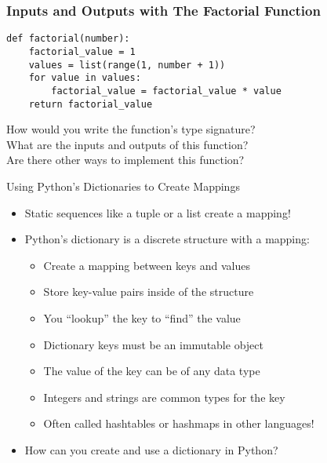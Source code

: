 \documentclass[14pt,aspectratio=169]{beamer}
\begin{document}
%
\begin{frame}[fragile]
  \frametitle{Inputs and Outputs with The Factorial Function}
  \hspace*{-.2in}
  \begin{minipage}{6in}
    \vspace*{.2in}
    \begin{verbatim}
def factorial(number):
    factorial_value = 1
    values = list(range(1, number + 1))
    for value in values:
        factorial_value = factorial_value * value
    return factorial_value
    \end{verbatim}
  \end{minipage}
  \vspace*{.025in}
  \begin{center}
    \normalsize \noindent How would you write the function's type signature? \\
    \normalsize \noindent What are the inputs and outputs of this function? \\
    \normalsize \noindent Are there other ways to implement this function? \\
  \end{center}
\end{frame}

%
\begin{frame}{Using Python's Dictionaries to Create Mappings}
  \begin{itemize}
    \item Static sequences like a tuple or a list create a mapping!
      \vspace*{-.15in}
    \item Python's dictionary is a discrete structure with a mapping:
      \begin{itemize}
        \item Create a mapping between keys and values
        \item Store key-value pairs inside of the structure
        \item You ``lookup'' the key to ``find'' the value
        \item Dictionary keys must be an immutable object
        \item The value of the key can be of any data type
        \item Integers and strings are common types for the key
        \item Often called hashtables or hashmaps in other languages!
      \end{itemize}
      \vspace*{-.2in}
    \item How can you create and use a dictionary in Python?
  \end{itemize}
\end{frame}
\end{document}
